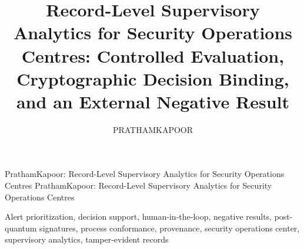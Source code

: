 \documentclass{ieeeaccess}
\begin{document}

\title{Record-Level Supervisory Analytics for Security Operations Centres:
Controlled Evaluation, Cryptographic Decision Binding, and an External Negative Result}

\author{\uppercase{PrathamKapoor}}
\address[1]{[Affiliation and e-mail to be supplied by the authors]}

\markboth
{PrathamKapoor: Record-Level Supervisory Analytics for Security Operations Centres}
{PrathamKapoor: Record-Level Supervisory Analytics for Security Operations Centres}


\begin{abstract}

\end{abstract}

\begin{keywords}
Alert prioritization, decision support, human-in-the-loop, negative results,
post-quantum signatures, process conformance, provenance, security operations center,
supervisory analytics, tamper-evident records
\end{keywords}

\titlepgskip=-21pt

\maketitle













\end{document}
